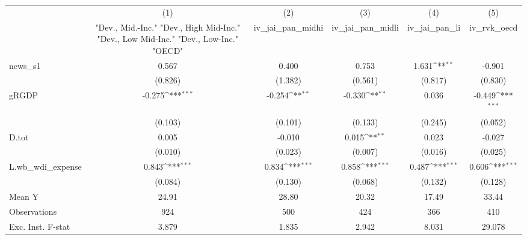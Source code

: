 {
\def\sym#1{\ifmmode^{#1}\else\(^{#1}\)\fi}
\begin{tabular}{l*{5}{c}}
\toprule
            &\multicolumn{1}{c}{(1)}&\multicolumn{1}{c}{(2)}&\multicolumn{1}{c}{(3)}&\multicolumn{1}{c}{(4)}&\multicolumn{1}{c}{(5)}\\
            &\multicolumn{1}{c}{ "Dev., Mid.-Inc." "Dev., High Mid-Inc." "Dev., Low Mid-Inc." "Dev., Low-Inc." "OECD" }&\multicolumn{1}{c}{iv\_jai\_pan\_midhi}&\multicolumn{1}{c}{iv\_jai\_pan\_midli}&\multicolumn{1}{c}{iv\_jai\_pan\_li}&\multicolumn{1}{c}{iv\_rvk\_oecd}\\
\midrule
news\_s1     &       0.567         &       0.400         &       0.753         &       1.631\sym{**} &      -0.901         \\
            &     (0.826)         &     (1.382)         &     (0.561)         &     (0.817)         &     (0.830)         \\
\addlinespace
gRGDP       &      -0.275\sym{***}&      -0.254\sym{**} &      -0.330\sym{**} &       0.036         &      -0.449\sym{***}\\
            &     (0.103)         &     (0.101)         &     (0.133)         &     (0.245)         &     (0.052)         \\
\addlinespace
D.tot       &       0.005         &      -0.010         &       0.015\sym{**} &       0.023         &      -0.027         \\
            &     (0.010)         &     (0.023)         &     (0.007)         &     (0.016)         &     (0.025)         \\
\addlinespace
L.wb\_wdi\_expense&       0.843\sym{***}&       0.834\sym{***}&       0.858\sym{***}&       0.487\sym{***}&       0.606\sym{***}\\
            &     (0.084)         &     (0.130)         &     (0.068)         &     (0.132)         &     (0.128)         \\
\midrule
Mean Y      &       24.91         &       28.80         &       20.32         &       17.49         &       33.44         \\
Observations&         924         &         500         &         424         &         366         &         410         \\
Exc. Inst. F-stat&       3.879         &       1.835         &       2.942         &       8.031         &      29.078         \\
\bottomrule
\end{tabular}
}
